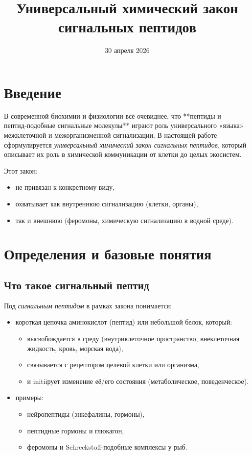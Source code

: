 \documentclass[12pt]{article}
\title{Универсальный химический закон сигнальных пептидов}
\author{}
\date{30 апреля 2026}
\begin{document}
\maketitle

\tableofcontents
\newpage

\section{Введение}

В современной биохимии и физиологии всё очевиднее, что **пептиды и пептид‑подобные сигнальные молекулы** играют роль универсального «языка» межклеточной и межорганизменной сигнализации. В настоящей работе сформулируется \emph{универсальный химический закон сигнальных пептидов}, который описывает их роль в химической коммуникации от клетки до целых экосистем.

Этот закон:
\begin{itemize}
  \item не привязан к конкретному виду,
  \item охватывает как внутреннюю сигнализацию (клетки, органы),
  \item так и внешнюю (феромоны, химическую сигнализацию в водной среде).
\end{itemize}

\section{Определения и базовые понятия}

\subsection{Что такое сигнальный пептид}

Под \emph{сигнальным пептидом} в рамках закона понимается:

\begin{itemize}
  \item короткая цепочка аминокислот (пептид) или небольшой белок, который:
    \begin{itemize}
      \item высвобождается в среду (внутриклеточное пространство, внеклеточная жидкость, кровь, морская вода),
      \item связывается с рецептором целевой клетки или организма,
      \item и	initiiрует изменение её/его состояния (метаболическое, поведенческое).
    \end{itemize}
  \item примеры:
    \begin{itemize}
      \item нейропептиды (энкефалины, гормоны),
      \item пептидные гормоны и глюкагон,
      \item феромоны и Schreckstoff‑подобные комплексы у рыб.
    \end{itemize}
\end{itemize}
\end{document}
